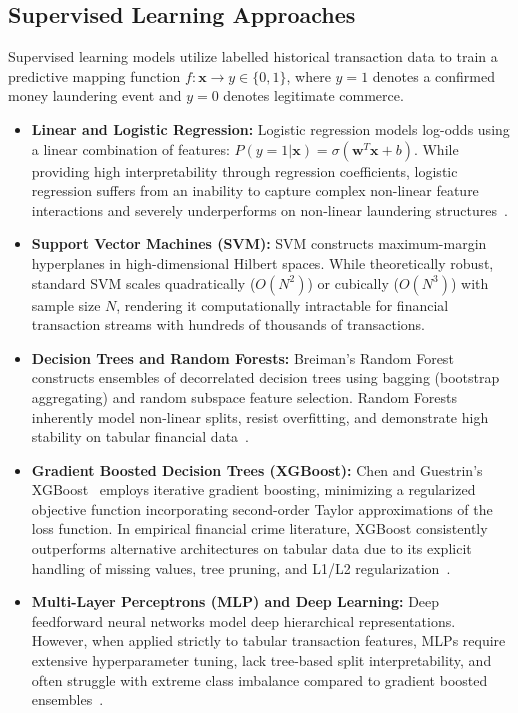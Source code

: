 \subsection{Supervised Learning Approaches}
Supervised learning models utilize labelled historical transaction data to train a predictive mapping function $f: \mathbf{x} \rightarrow y \in \{0, 1\}$, where $y=1$ denotes a confirmed money laundering event and $y=0$ denotes legitimate commerce.
\begin{itemize}
    \item \textbf{Linear and Logistic Regression:} Logistic regression models log-odds using a linear combination of features: $P(y=1|\mathbf{x}) = \sigma(\mathbf{w}^T \mathbf{x} + b)$. While providing high interpretability through regression coefficients, logistic regression suffers from an inability to capture complex non-linear feature interactions and severely underperforms on non-linear laundering structures~\cite{harris2022using}.
    \item \textbf{Support Vector Machines (SVM):} SVM constructs maximum-margin hyperplanes in high-dimensional Hilbert spaces. While theoretically robust, standard SVM scales quadratically ($O(N^2)$) or cubically ($O(N^3)$) with sample size $N$, rendering it computationally intractable for financial transaction streams with hundreds of thousands of transactions.
    \item \textbf{Decision Trees and Random Forests:} Breiman's Random Forest~\cite{breiman2001random} constructs ensembles of decorrelated decision trees using bagging (bootstrap aggregating) and random subspace feature selection. Random Forests inherently model non-linear splits, resist overfitting, and demonstrate high stability on tabular financial data~\cite{randhawa2018credit, lokanan2022predicting}.
    \item \textbf{Gradient Boosted Decision Trees (XGBoost):} Chen and Guestrin's XGBoost~\cite{chen2016xgboost} employs iterative gradient boosting, minimizing a regularized objective function incorporating second-order Taylor approximations of the loss function. In empirical financial crime literature, XGBoost consistently outperforms alternative architectures on tabular data due to its explicit handling of missing values, tree pruning, and L1/L2 regularization~\cite{harris2022using, jullum2020detecting}.
    \item \textbf{Multi-Layer Perceptrons (MLP) and Deep Learning:} Deep feedforward neural networks model deep hierarchical representations. However, when applied strictly to tabular transaction features, MLPs require extensive hyperparameter tuning, lack tree-based split interpretability, and often struggle with extreme class imbalance compared to gradient boosted ensembles~\cite{esenogho2022neural, chen2021deep}.
\end{itemize}


